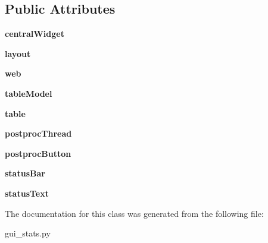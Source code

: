 \subsection*{Public Attributes}
\begin{DoxyCompactItemize}
\item 
\mbox{\label{classgui__stats_1_1_main_win_a47339308c055db4a8f835ab19e78166e}} 
{\bfseries central\+Widget}
\item 
\mbox{\label{classgui__stats_1_1_main_win_a2a1057d2729e0b7f87735ba5255bbb6f}} 
{\bfseries layout}
\item 
\mbox{\label{classgui__stats_1_1_main_win_a3843a869a1d1f8171fb4be18ae71ed9a}} 
{\bfseries web}
\item 
\mbox{\label{classgui__stats_1_1_main_win_a476338ddcc1fd7d4397e4c8f0b5584f9}} 
{\bfseries table\+Model}
\item 
\mbox{\label{classgui__stats_1_1_main_win_a0aeb41d7fb95beb754f28e0bccaec3e4}} 
{\bfseries table}
\item 
\mbox{\label{classgui__stats_1_1_main_win_a4b4e4420e97fb8eb15208559dd9b5040}} 
{\bfseries postproc\+Thread}
\item 
\mbox{\label{classgui__stats_1_1_main_win_a68a8ad2c5beea4b30aadd6c3cf11f853}} 
{\bfseries postproc\+Button}
\item 
\mbox{\label{classgui__stats_1_1_main_win_a16d6722979fb1411d4f9a6cb9187a245}} 
{\bfseries status\+Bar}
\item 
\mbox{\label{classgui__stats_1_1_main_win_a76baa6c99897dd33e57bb006a05bbe20}} 
{\bfseries status\+Text}
\end{DoxyCompactItemize}


The documentation for this class was generated from the following file\+:\begin{DoxyCompactItemize}
\item 
gui\+\_\+stats.\+py\end{DoxyCompactItemize}
